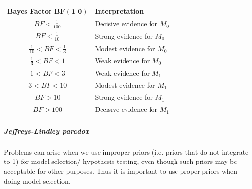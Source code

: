 \begin{table}
	\begin{tabular}{|cl|}
		\hline
	\textbf{Bayes Factor} $\bm{BF(1,0)}$ & \textbf{Interpretation}\\
		\hline
		$BF<\frac{1}{100}$ & Decisive evidence for $M_{0}$\\
		\hline
		$BF<\frac{1}{10}$ & Strong evidence for $M_{0}$\\
		\hline
		$\frac{1}{10}<BF<\frac{1}{3}$ & Modest evidence for $M_{0}$\\
		\hline
		$\frac{1}{3}<BF<1$ & Weak evidence for $M_{0}$\\
		\hline
		$1<BF<3$ & Weak evidence for $M_{1}$\\
		\hline
		$3<BF<10$ & Modest evidence for $M_{1}$\\
		\hline
		$BF>10 $ &  Strong evidence for $M_{1}$\\
		\hline
		$BF>100$ & Decisive evidence for $M_{1}$\\
		\hline
	\end{tabular}
\end{table}

\subparagraph{Jeffreys-Lindley paradox}
Problems can arise when we use improper priors (i.e. priors that do not integrate to 1)
for model selection/ hypothesis testing, even though such priors may be acceptable for 
other purposes. Thus it is important to use proper priors when doing model selection.

